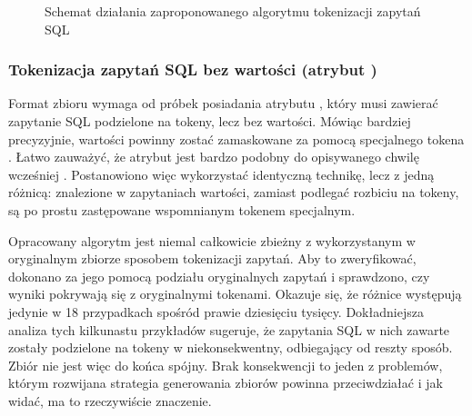 \begin{figure}[ht!]
  \centering
  
  \caption{Schemat działania zaproponowanego algorytmu tokenizacji zapytań SQL}
  \label{fig:query-tokenization}
\end{figure}

\subsubsection{Tokenizacja zapytań SQL bez wartości (atrybut )}
Format zbioru  wymaga od próbek posiadania atrybutu , który musi zawierać zapytanie SQL podzielone na tokeny, lecz bez wartości. Mówiąc bardziej precyzyjnie, wartości powinny zostać zamaskowane za pomocą specjalnego tokena . Łatwo zauważyć, że atrybut  jest bardzo podobny do opisywanego chwilę wcześniej . Postanowiono więc wykorzystać identyczną technikę, lecz z jedną różnicą: znalezione w zapytaniach wartości, zamiast podlegać rozbiciu na tokeny, są po prostu zastępowane wspomnianym tokenem specjalnym. 

Opracowany algorytm jest niemal całkowicie zbieżny z wykorzystanym w oryginalnym zbiorze  sposobem tokenizacji zapytań. Aby to zweryfikować, dokonano za jego pomocą podziału oryginalnych zapytań i sprawdzono, czy wyniki pokrywają się z oryginalnymi tokenami. Okazuje się, że różnice występują jedynie w 18 przypadkach spośród prawie dziesięciu tysięcy. Dokładniejsza analiza tych kilkunastu przykładów sugeruje, że zapytania SQL w nich zawarte zostały podzielone na tokeny w niekonsekwentny, odbiegający od reszty sposób. Zbiór  nie jest więc do końca spójny. Brak konsekwencji to jeden z problemów, którym rozwijana strategia generowania zbiorów powinna przeciwdziałać i jak widać, ma to rzeczywiście znaczenie.

